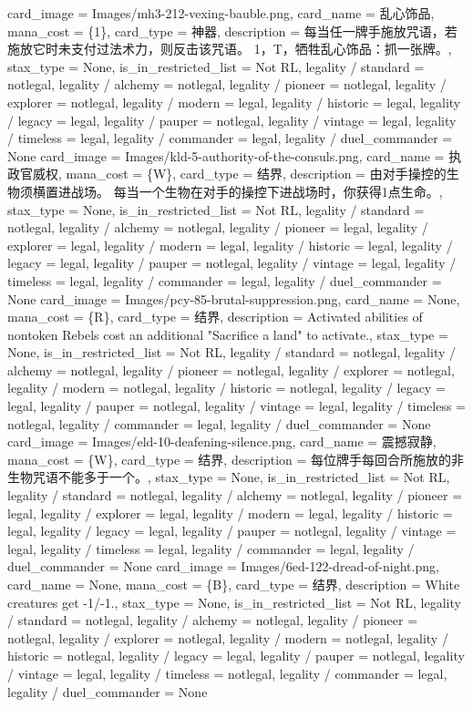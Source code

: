 \documentclass[lang = cn, color = black, 10pt]{AllThatStax}
\begin{document}
\card
{
	card_image = Images/mh3-212-vexing-bauble.png,
	card_name = 乱心饰品,
	mana_cost = \{1\},
	card_type = 神器,
	description = 每当任一牌手施放咒语，若施放它时未支付过法术力，则反击该咒语。
	{1}，{T}，牺牲乱心饰品：抓一张牌。,
	stax_type = None,
	is_in_restricted_list = Not RL,
	legality / standard = notlegal,
	legality / alchemy = notlegal,
	legality / pioneer = notlegal,
	legality / explorer = notlegal,
	legality / modern = legal,
	legality / historic = legal,
	legality / legacy = legal,
	legality / pauper = notlegal,
	legality / vintage = legal,
	legality / timeless = legal,
	legality / commander = legal,
	legality / duel_commander = None
}
\card
{
	card_image = Images/kld-5-authority-of-the-consuls.png,
	card_name = 执政官威权,
	mana_cost = \{W\},
	card_type = 结界,
	description = 由对手操控的生物须横置进战场。
	每当一个生物在对手的操控下进战场时，你获得1点生命。,
	stax_type = None,
	is_in_restricted_list = Not RL,
	legality / standard = notlegal,
	legality / alchemy = notlegal,
	legality / pioneer = legal,
	legality / explorer = legal,
	legality / modern = legal,
	legality / historic = legal,
	legality / legacy = legal,
	legality / pauper = notlegal,
	legality / vintage = legal,
	legality / timeless = legal,
	legality / commander = legal,
	legality / duel_commander = None
}
\card
{
	card_image = Images/pcy-85-brutal-suppression.png,
	card_name = None,
	mana_cost = \{R\},
	card_type = 结界,
	description = Activated abilities of nontoken Rebels cost an additional "Sacrifice a land" to activate.,
	stax_type = None,
	is_in_restricted_list = Not RL,
	legality / standard = notlegal,
	legality / alchemy = notlegal,
	legality / pioneer = notlegal,
	legality / explorer = notlegal,
	legality / modern = notlegal,
	legality / historic = notlegal,
	legality / legacy = legal,
	legality / pauper = notlegal,
	legality / vintage = legal,
	legality / timeless = notlegal,
	legality / commander = legal,
	legality / duel_commander = None
}
\card
{
	card_image = Images/eld-10-deafening-silence.png,
	card_name = 震撼寂静,
	mana_cost = \{W\},
	card_type = 结界,
	description = 每位牌手每回合所施放的非生物咒语不能多于一个。,
	stax_type = None,
	is_in_restricted_list = Not RL,
	legality / standard = notlegal,
	legality / alchemy = notlegal,
	legality / pioneer = legal,
	legality / explorer = legal,
	legality / modern = legal,
	legality / historic = legal,
	legality / legacy = legal,
	legality / pauper = notlegal,
	legality / vintage = legal,
	legality / timeless = legal,
	legality / commander = legal,
	legality / duel_commander = None
}
\card
{
	card_image = Images/6ed-122-dread-of-night.png,
	card_name = None,
	mana_cost = \{B\},
	card_type = 结界,
	description = White creatures get -1/-1.,
	stax_type = None,
	is_in_restricted_list = Not RL,
	legality / standard = notlegal,
	legality / alchemy = notlegal,
	legality / pioneer = notlegal,
	legality / explorer = notlegal,
	legality / modern = notlegal,
	legality / historic = notlegal,
	legality / legacy = legal,
	legality / pauper = notlegal,
	legality / vintage = legal,
	legality / timeless = notlegal,
	legality / commander = legal,
	legality / duel_commander = None
}
\end{document}
